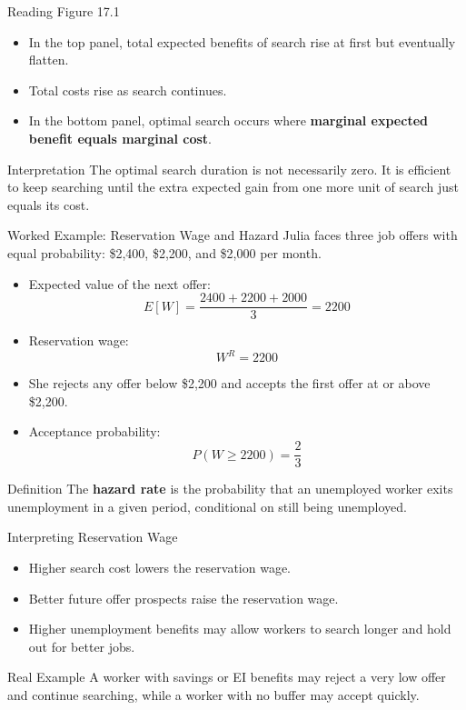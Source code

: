 \documentclass[aspectratio=169]{beamer}
\begin{document}
\begin{frame}{Reading Figure 17.1}
\transfade
\begin{itemize}[<+->]
  \item In the top panel, total expected benefits of search rise at first but eventually flatten.
  \item Total costs rise as search continues.
  \item In the bottom panel, optimal search occurs where \textbf{marginal expected benefit equals marginal cost}.
\end{itemize}

\begin{block}{Interpretation}
The optimal search duration is not necessarily zero. It is efficient to keep searching until the extra expected gain from one more unit of search just equals its cost.
\end{block}
\end{frame}

\begin{frame}{Worked Example: Reservation Wage and Hazard}
\transfade
Julia faces three job offers with equal probability: \$2,400, \$2,200, and \$2,000 per month.

\begin{itemize}[<+->]
  \item Expected value of the next offer:
  \[
  E[W] = \frac{2400 + 2200 + 2000}{3} = 2200
  \]
  \item Reservation wage:
  \[
  W^R = 2200
  \]
  \item She rejects any offer below \$2,200 and accepts the first offer at or above \$2,200.
  \item Acceptance probability:
  \[
  P(W \geq 2200) = \frac{2}{3}
  \]
\end{itemize}

\begin{block}{Definition}
The \textbf{hazard rate} is the probability that an unemployed worker exits unemployment in a given period, conditional on still being unemployed.
\end{block}
\end{frame}

\begin{frame}{Interpreting Reservation Wage}
\transfade
\begin{itemize}[<+->]
  \item Higher search cost lowers the reservation wage.
  \item Better future offer prospects raise the reservation wage.
  \item Higher unemployment benefits may allow workers to search longer and hold out for better jobs.
\end{itemize}

\begin{exampleblock}{Real Example}
A worker with savings or EI benefits may reject a very low offer and continue searching, while a worker with no buffer may accept quickly.
\end{exampleblock}
\end{frame}
\end{document}
